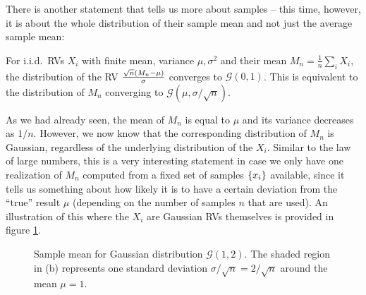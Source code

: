 There is another statement that tells us more about samples -- this time, however, it is about the whole distribution of their sample mean and not just the average sample mean:
\begin{prop}
For i.i.d.~RVs $X_i$ with finite mean, variance $\mu, \sigma^2$ and their mean $M_n = \frac{1}{n} \sum_i X_i$, the distribution of the RV $\frac{\sqrt{n} \qty(M_n - \mu)}{\sigma}$ converges to $\mathcal{G}(0, 1)$.\footnotemark{} This is equivalent to the distribution of $M_n$ converging to $\mathcal{G}(\mu, \sigma / \sqrt{n})$.
\end{prop}

As we had already seen, the mean of $M_n$ is equal to $\mu$ and its variance decreases as $1 / n$. However, we now know that the corresponding distribution of $M_n$ is Gaussian, regardless of the underlying distribution of the $X_i$. Similar to the law of large numbers, this is a very interesting statement in case we only have one realization of $M_n$ computed from a fixed set of samples $\qty{x_i}$ available, since it tells us something about how likely it is to have a certain deviation from the \enquote{true} result $\mu$ (depending on the number of samples $n$ that are used). An illustration of this where the $X_i$ are Gaussian RVs themselves is provided in figure \ref{fig:central_limit}.




\begin{figure}
\centering

%
\hspace{0.04\textwidth}%
%

\caption{Sample mean for Gaussian distribution $\mathcal{G}(1, 2)$. The shaded region in (b) represents one standard deviation $\sigma / \sqrt{n} = 2 / \sqrt{n}$ around the mean $\mu = 1$.}
\label{fig:central_limit}
\end{figure}




